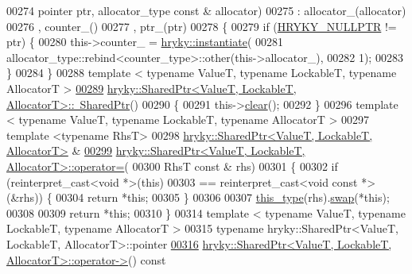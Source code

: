 \begin{DoxyCode}
00274     pointer ptr, allocator\_type \textcolor{keyword}{const} & allocator)
00275     : allocator\_(allocator)
00276       , counter\_()
00277       , ptr\_(ptr)
00278 \{
00279     \textcolor{keywordflow}{if} (\hyperlink{common_8h_a4cd4ac09cfcdbd6b30ee69afc156e210}{HRYKY_NULLPTR} != ptr) \{
00280         this->counter\_ = \hyperlink{classhryky_1_1_shared_ptr_a51f756b899403aa6c8a182bb5bbfd6a8}{hryky::instantiate}(
00281             allocator\_type::rebind<counter\_type>::other(this->allocator\_),
00282             1);
00283     \}
00284 \}
00288 \textcolor{keyword}{template} < \textcolor{keyword}{typename} ValueT, \textcolor{keyword}{typename} LockableT, \textcolor{keyword}{typename} AllocatorT >
\hypertarget{shared__ptr_8h_source_l00289}{}\hyperlink{classhryky_1_1_shared_ptr_a8a0abab882ae5fdee33fe7cac6b99780}{00289} \hyperlink{classhryky_1_1_shared_ptr}{hryky::SharedPtr<ValueT, LockableT, AllocatorT>::~SharedPtr}()
00290 \{
00291     this->\hyperlink{namespacehryky_aa201297ea9530da954a7230be71cc19d}{clear}();
00292 \}
00296 \textcolor{keyword}{template} < \textcolor{keyword}{typename} ValueT, \textcolor{keyword}{typename} LockableT, \textcolor{keyword}{typename} AllocatorT >
00297 \textcolor{keyword}{template} <\textcolor{keyword}{typename} RhsT>
00298 \hyperlink{classhryky_1_1_shared_ptr}{hryky::SharedPtr<ValueT, LockableT, AllocatorT>} &
\hypertarget{shared__ptr_8h_source_l00299}{}\hyperlink{classhryky_1_1_shared_ptr_abd4590ba41a2c8837130a38f08f531ba}{00299} \hyperlink{classhryky_1_1_shared_ptr}{hryky::SharedPtr<ValueT, LockableT, AllocatorT>::operator=}(
00300     RhsT \textcolor{keyword}{const} & rhs)
00301 \{
00302     \textcolor{keywordflow}{if} (reinterpret\_cast<void *>(\textcolor{keyword}{this})
00303         == reinterpret\_cast<void const *>(&rhs)) \{
00304         \textcolor{keywordflow}{return} *\textcolor{keyword}{this};
00305     \}
00306 
00307     \hyperlink{classhryky_1_1_shared_ptr}{this_type}(rhs).\hyperlink{classhryky_1_1_shared_ptr_a31ff2b6615bf4240b3ec8bcbcc06acc0}{swap}(*\textcolor{keyword}{this});
00308     
00309     \textcolor{keywordflow}{return} *\textcolor{keyword}{this};
00310 \}
00314 \textcolor{keyword}{template} < \textcolor{keyword}{typename} ValueT, \textcolor{keyword}{typename} LockableT, \textcolor{keyword}{typename} AllocatorT >
00315 \textcolor{keyword}{typename} hryky::SharedPtr<ValueT, LockableT, AllocatorT>::pointer
\hypertarget{shared__ptr_8h_source_l00316}{}\hyperlink{classhryky_1_1_shared_ptr_aa12d9a92ab59e8f6c1c06a93390fc1fd}{00316} \hyperlink{classhryky_1_1_shared_ptr}{hryky::SharedPtr<ValueT, LockableT, AllocatorT>::operator->}()\textcolor{keyword}{ const}

\end{DoxyCode}
